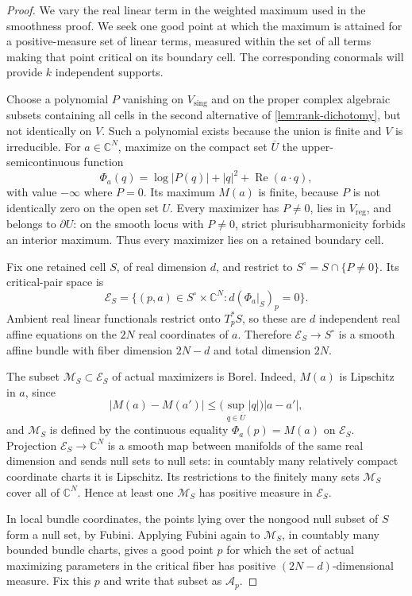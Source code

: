 \begin{proof}
We vary the real linear term in the weighted maximum used in the smoothness proof.  We seek one good point at which the maximum is attained for a positive-measure set of linear terms, measured within the set of all terms making that point critical on its boundary cell. The corresponding conormals will provide $k$ independent supports.

Choose a polynomial $P$ vanishing on $V_{\mathrm{sing}}$ and on the proper complex algebraic subsets containing all cells in the second alternative of \cref{lem:rank-dichotomy}, but not identically on $V$.  Such a polynomial exists because the union is finite and $V$ is irreducible.  For $a\in\mathbb{C}^N$, maximize on the compact set $\overline U$ the upper-semicontinuous function
\[
 \Phi_a(q)=\log|P(q)|+|q|^2+\operatorname{Re}(a\cdot q),
\]
with value $-\infty$ where $P=0$.  Its maximum $M(a)$ is finite, because $P$ is not identically zero on the open set $U$.  Every maximizer has $P\ne0$, lies in $V_{\mathrm{reg}}$, and belongs to $\partial U$: on the smooth locus with $P\ne0$, strict plurisubharmonicity forbids an interior maximum.  Thus every maximizer lies on a retained boundary cell.

Fix one retained cell $S$, of real dimension $d$, and restrict to $S^\circ=S\cap\{P\ne0\}$.  Its critical-pair space is
\[
 \mathcal{E}_S=
 \{(p,a)\in S^\circ\times\mathbb{C}^N:
                  d(\Phi_a|_S)_p=0\}.
\]
Ambient real linear functionals restrict onto $T_p^*S$, so these are $d$ independent real affine equations on the $2N$ real coordinates of $a$.  Therefore $\mathcal{E}_S\to S^\circ$ is a smooth affine bundle with fiber dimension $2N-d$ and total dimension $2N$.

The subset $\mathcal{M}_S\subset\mathcal{E}_S$ of actual maximizers is Borel.  Indeed, $M(a)$ is Lipschitz in $a$, since
\[
 |M(a)-M(a')|
 \leq\bigl(\sup_{q\in\overline U}|q|\bigr)|a-a'|,
\]
and $\mathcal{M}_S$ is defined by the continuous equality $\Phi_a(p)=M(a)$ on $\mathcal{E}_S$.  Projection $\mathcal{E}_S\to\mathbb{C}^N$ is a smooth map between manifolds of the same real dimension and sends null sets to null sets: in countably many relatively compact coordinate charts it is Lipschitz.  Its restrictions to the finitely many sets $\mathcal{M}_S$ cover all of $\mathbb{C}^N$.  Hence at least one $\mathcal{M}_S$ has positive measure in $\mathcal{E}_S$.

In local bundle coordinates, the points lying over the nongood null subset of $S$ form a null set, by Fubini.  Applying Fubini again to $\mathcal{M}_S$, in countably many bounded bundle charts, gives a good point $p$ for which the set of actual maximizing parameters in the critical fiber has positive $(2N-d)$-dimensional measure.  Fix this $p$ and write that subset as $\mathcal{A}_p$.


\end{proof}
